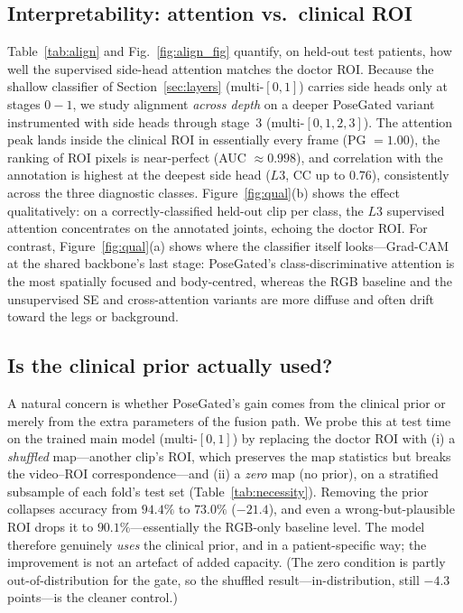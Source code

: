 \documentclass[review,authoryear,times]{elsarticle}
\begin{document}
\subsection{Interpretability: attention vs.\ clinical ROI}
\label{sec:interp}
Table~\ref{tab:align} and Fig.~\ref{fig:align_fig} quantify, on held-out test
patients, how well the supervised side-head attention matches the doctor ROI.
Because the shallow classifier of Section~\ref{sec:layers} (multi-$[0,1]$) carries
side heads only at stages $0\!-\!1$, we study alignment \emph{across depth} on a
deeper PoseGated variant instrumented with side heads through stage~$3$
(multi-$[0,1,2,3]$). The attention peak lands inside the clinical ROI in
essentially every frame (PG $=1.00$), the ranking of ROI pixels is near-perfect
(AUC $\approx 0.998$), and correlation with the annotation is highest at the
deepest side head ($L3$, CC up to $0.76$), consistently across the three
diagnostic classes. Figure~\ref{fig:qual}(b) shows the effect qualitatively:
on a correctly-classified held-out clip per class, the $L3$ supervised attention
concentrates on the annotated joints, echoing the doctor ROI. For contrast,
Figure~\ref{fig:qual}(a) shows where the classifier itself looks---Grad-CAM
\citep{selvaraju2017gradcam} at the shared backbone's last stage: PoseGated's
class-discriminative attention is the most spatially focused and body-centred,
whereas the RGB baseline and the unsupervised SE and cross-attention variants are
more diffuse and often drift toward the legs or background.

\subsection{Is the clinical prior actually used?}
\label{sec:necessity}
A natural concern is whether PoseGated's gain comes from the clinical prior or
merely from the extra parameters of the fusion path. We probe this at test time on
the trained main model (multi-$[0,1]$) by replacing the doctor ROI with (i) a
\emph{shuffled} map---another clip's ROI, which preserves the map statistics but
breaks the video--ROI correspondence---and (ii) a \emph{zero} map (no prior),
on a stratified subsample of each fold's test set (Table~\ref{tab:necessity}).
Removing the prior collapses accuracy from $94.4\%$ to $73.0\%$ ($-21.4$), and
even a wrong-but-plausible ROI drops it to $90.1\%$---essentially the RGB-only
baseline level. The model therefore genuinely \emph{uses} the clinical prior, and
in a patient-specific way; the improvement is not an artefact of added capacity.
(The zero condition is partly out-of-distribution for the gate, so the shuffled
result---in-distribution, still $-4.3$ points---is the cleaner control.)
\end{document}
